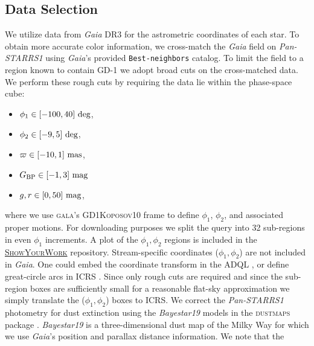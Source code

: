\documentclass[twocolumn]{aastex631}
\newcommand{\code}[1]{\textsc{#1}}
\newcommand{\package}[1]{\code{#1}}
\newcommand{\stream}[1]{#1}
\newcommand{\dataarchive}[1]{\textit{#1}}
\newcommand{\Gaia}{\dataarchive{Gaia}}
\newcommand{\PanStarrs}{\dataarchive{Pan-STARRS1}}
\newcommand{\parallax}{\varpi}
\begin{document}
    \subsection{Data Selection} \label{sub:results_gd1:data}

        We utilize data from \Gaia{} DR3 for the astrometric coordinates of each
        star.  To obtain more accurate color information, we cross-match the
        \Gaia{} field on \PanStarrs{} \citep{PanSTARRS1} using \Gaia's provided
        \texttt{Best-neighbors} catalog.  To limit the field to a region known
        to contain \stream{GD-1} we adopt broad cuts on the cross-matched data.
        We perform these rough cuts by requiring the data lie within the
        phase-space cube:
        \begin{itemize}
            \setlength\itemsep{0em}
            \item $\phi_1 \in [-100, 40] \ \rm{deg}$,
            \item $\phi_2 \in [-9, 5] \ \rm{deg}$,
            \item $\parallax \in [-10, 1] \ \rm{mas}$,
            \item $G_{\rm BP} \in [-1, 3] \ \rm{mag}$
            \item $g, r \in [0, 50] \ \rm{mag}$, %
        \end{itemize}
        where we use \package{gala}'s \citep{gala, galav1.3} \code{GD1Koposov10}
        frame \citep{Koposov+2010} to define $\phi_1$, $\phi_2$, and associated
        proper motions.  For downloading purposes we split the query into 32
        sub-regions in even $\phi_1$ increments.
        A plot of the $\phi_1, \phi_2$ regions is included in the
        \href{\GitHubURL{}}{\package{ShowYourWork}} repository.  Stream-specific
        coordinates ($\phi_1, \phi_2$) are not included in \Gaia.  One could
        embed the coordinate transform in the ADQL \citep{ADQL2.0}, or define
        great-circle arcs in ICRS \citep{ICRS1997}. Since only rough cuts are
        required and since the sub-region boxes are sufficiently small for a
        reasonable flat-sky approximation  we simply translate the ($\phi_1,
        \phi_2$) boxes to ICRS.  We correct the \PanStarrs{} photometry for dust
        extinction using the \textit{Bayestar19} \citep{Green+2019} models in
        the \package{dustmaps} package \citep{Green2018}.  \textit{Bayestar19}
        is a three-dimensional dust map of the Milky Way for which we use
        \Gaia's position and parallax distance information. We note that the
\end{document}
